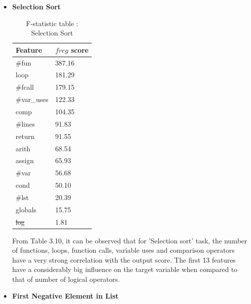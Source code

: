 \begin{itemize}
\item \textbf{Selection Sort}
  \begin{table}[H]
    \centering
    \caption{F-statistic table : Selection Sort}
    \begin{tabular}{|l|l|}
      \hline
      \textbf{Feature} & \textbf{$f{reg}$ score} \\ \hline
      \#fun            & 387.16                \\ \hline
      loop             & 181.29                \\ \hline
      \#fcall          & 179.15                \\ \hline
      \#var\_uses      & 122.33                \\ \hline
      comp             & 104.35                \\ \hline
      \#lines          & 91.83                 \\ \hline
      return           & 91.55                 \\ \hline
      arith            & 68.54                 \\ \hline
      assign           & 65.93                 \\ \hline
      \#var            & 56.68                 \\ \hline
      cond             & 50.10                 \\ \hline
      \#lst            & 20.39                 \\ \hline
      globals          & 15.75                 \\ \hline
      \st{log}              & 1.81                  \\ \hline
    \end{tabular}
            
    \label{ss_f}
  \end{table}
            
  From Table 3.10, it can be observed that for 'Selection
  sort' task, the number of functions, loops, function calls,
  variable uses and comparison operators have a very strong
  correlation with the output score. The first 13 features
  have a considerably big influence on the target variable
  when compared to that of number of logical operators.
            
\item \textbf{First Negative Element in List}


\end{itemize}
